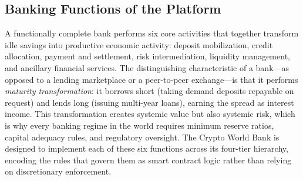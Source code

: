 \documentclass[12pt,a4paper]{report}
\begin{document}
\subsection{Banking Functions of the Platform}
\label{sec:banking-functions}

A functionally complete bank performs six core activities that together transform idle savings into productive economic activity: deposit mobilization, credit allocation, payment and settlement, risk intermediation, liquidity management, and ancillary financial services. The distinguishing characteristic of a bank---as opposed to a lending marketplace or a peer-to-peer exchange---is that it performs \textit{maturity transformation}: it borrows short (taking demand deposits repayable on request) and lends long (issuing multi-year loans), earning the spread as interest income. This transformation creates systemic value but also systemic risk, which is why every banking regime in the world requires minimum reserve ratios, capital adequacy rules, and regulatory oversight. The Crypto World Bank is designed to implement each of these six functions across its four-tier hierarchy, encoding the rules that govern them as smart contract logic rather than relying on discretionary enforcement.
\end{document}
